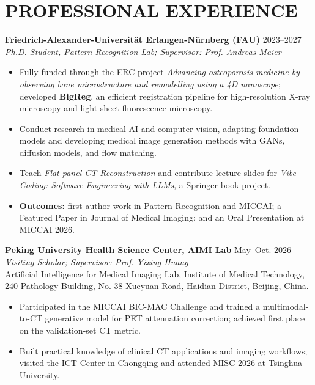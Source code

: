 \documentclass[10pt,a4paper]{article}
\begin{document}
\section{PROFESSIONAL EXPERIENCE}
\textbf{Friedrich-Alexander-Universität Erlangen-Nürnberg (FAU)} \hfill 2023--2027\\
\textit{Ph.D. Student, Pattern Recognition Lab; Supervisor: Prof. Andreas Maier}
\begin{itemize}
    \item Fully funded through the ERC project \textit{Advancing osteoporosis medicine by observing bone microstructure and remodelling using a 4D nanoscope}; developed \textbf{BigReg}, an efficient registration pipeline for high-resolution X-ray microscopy and light-sheet fluorescence microscopy.
    \item Conduct research in medical AI and computer vision, adapting foundation models and developing medical image generation methods with GANs, diffusion models, and flow matching.
    \item Teach \textit{Flat-panel CT Reconstruction} and contribute lecture slides for \textit{Vibe Coding: Software Engineering with LLMs}, a Springer book project.
    \item \textbf{Outcomes:} first-author work in Pattern Recognition and MICCAI; a Featured Paper in Journal of Medical Imaging; and an Oral Presentation at MICCAI 2026.
\end{itemize}
\textbf{Peking University Health Science Center, AIMI Lab} \hfill May--Oct. 2026\\
\textit{Visiting Scholar; Supervisor: Prof. Yixing Huang}\\
Artificial Intelligence for Medical Imaging Lab, Institute of Medical Technology, 240 Pathology Building, No. 38 Xueyuan Road, Haidian District, Beijing, China.
\begin{itemize}
    \item Participated in the MICCAI BIC-MAC Challenge and trained a multimodal-to-CT generative model for PET attenuation correction; achieved first place on the validation-set CT metric.
    \item Built practical knowledge of clinical CT applications and imaging workflows; visited the ICT Center in Chongqing and attended MISC 2026 at Tsinghua University.
\end{itemize}
\end{document}
